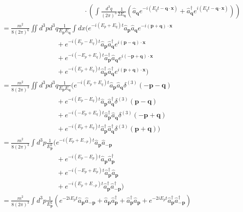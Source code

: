 \documentclass[10pt,a4paper]{report}
\theoremstyle{definition}
\begin{document}
\begin{enumerate}[a)]
\begin{align}
&\qquad\qquad\qquad\qquad\qquad\qquad\cdot\left(\int \frac{d^3q}{(2\pi)^3}\frac{1}{2E_\mathbf{q}}
(\hat{a}_\mathbf{q}e^{-i(E_qt-\mathbf{q\cdot x})}
+\hat{a}_\mathbf{q}^\dagger e^{i(E_qt-\mathbf{q\cdot x})})\right)\\
&=\frac{m^2}{8(2\pi)^6}\iint d^3pd^3q\frac{1}{E_\mathbf{p}E_\mathbf{q}}\int dx(
e^{-i(E_p+E_q)t}\hat{a}_\mathbf{p}\hat{a}_\mathbf{q}e^{-i(\mathbf{p}+\mathbf{q})\cdot\mathbf{x}}\\
&\qquad\qquad\qquad\qquad+
e^{-i(E_p-E_q)t}\hat{a}_\mathbf{p}\hat{a}^\dagger_\mathbf{q}e^{i(\mathbf{p}-\mathbf{q})\cdot\mathbf{x}}\\
&\qquad\qquad\qquad\qquad+
e^{-i(-E_p+E_q)t}\hat{a}^\dagger_\mathbf{p}\hat{a}_\mathbf{q}e^{i(-\mathbf{p}+\mathbf{q})\cdot\mathbf{x}}\\
&\qquad\qquad\qquad\qquad+
e^{-i(E_p+E_q)t}\hat{a}^\dagger_\mathbf{p}\hat{a}^\dagger_\mathbf{q}e^{i(\mathbf{p}+\mathbf{q})\cdot\mathbf{x}}
)\\
&=\frac{m^2}{8(2\pi)^3}\iint d^3pd^3q\frac{1}{E_\mathbf{p}E_\mathbf{q}}(
e^{-i(E_p+E_q)t}\hat{a}_\mathbf{p}\hat{a}_\mathbf{q}\delta^{(3)}(-\mathbf{p}-\mathbf{q})\\
&\qquad\qquad\qquad\qquad+
e^{-i(E_p-E_q)t}\hat{a}_\mathbf{p}\hat{a}^\dagger_\mathbf{q}\delta^{(3)}(\mathbf{p}-\mathbf{q})\\
&\qquad\qquad\qquad\qquad+
e^{-i(-E_p+E_q)t}\hat{a}^\dagger_\mathbf{p}\hat{a}_\mathbf{q}\delta^{(3)}(-\mathbf{p}+\mathbf{q})\\
&\qquad\qquad\qquad\qquad+
e^{-i(E_p+E_q)t}\hat{a}^\dagger_\mathbf{p}\hat{a}^\dagger_\mathbf{q}\delta^{(3)}(\mathbf{p}+\mathbf{q})
)\\
&=\frac{m^2}{8(2\pi)^3}\int d^3p\frac{1}{E_\mathbf{p}^2}(
e^{-i(E_p+E_{-p})t}\hat{a}_\mathbf{p}\hat{a}_\mathbf{-p}\\
&\qquad\qquad\qquad\qquad+
e^{-i(E_p-E_p)t}\hat{a}_\mathbf{p}\hat{a}^\dagger_\mathbf{p}\\
&\qquad\qquad\qquad\qquad+
e^{-i(-E_p+E_p)t}\hat{a}^\dagger_\mathbf{p}\hat{a}_\mathbf{p}\\
&\qquad\qquad\qquad\qquad+
e^{-i(E_p+E_{-p})t}\hat{a}^\dagger_\mathbf{p}\hat{a}^\dagger_\mathbf{-p}
)\\
&=\frac{m^2}{8(2\pi)^3}\int d^3p\frac{1}{E_\mathbf{p}^2}(
e^{-2iE_pt}\hat{a}_\mathbf{p}\hat{a}_\mathbf{-p}
+
\hat{a}_\mathbf{p}\hat{a}^\dagger_\mathbf{p}
+
\hat{a}^\dagger_\mathbf{p}\hat{a}_\mathbf{p}
+
e^{-2iE_pt}\hat{a}^\dagger_\mathbf{p}\hat{a}^\dagger_\mathbf{-p}
)\\
\end{align}

\end{enumerate}
\end{document}
